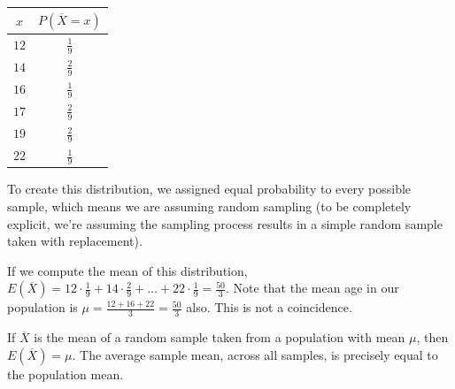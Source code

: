 \begin{example}
\vspace{-1em}
\begin{center}
    \begin{minipage}{.45\textwidth}
        \centering
      \renewcommand*{\arraystretch}{1.35}
\begin{tabular}{c|c}
$x$ & $P(\overline{X} = x)$ \\
\hline
$12$ & $\frac{1}{9}$ \\
$14$ & $\frac{2}{9}$ \\
$16$ & $\frac{1}{9}$ \\
$17$ & $\frac{2}{9}$ \\
$19$ & $\frac{2}{9}$ \\
$22$ & $\frac{1}{9}$
\end{tabular}
\renewcommand*{\arraystretch}{1}
\vspace{0.25em}
    \end{minipage}%
    \begin{minipage}{0.5\textwidth}
        \centering
{}
\end{minipage}
\end{center}
\begin{keypoint}
To create this distribution, we assigned equal probability to every possible sample, which means we are assuming random sampling (to be completely explicit, we're assuming the sampling process results in a simple random sample taken with replacement).
\end{keypoint}
If we compute the mean of this distribution, $E(\overline{X}) = 12 \cdot \frac{1}{9} + 14 \cdot \frac{2}{9} + \dots + 22 \cdot \frac{1}{9} = \frac{50}{3}$. Note that the mean age in our population is $\mu = \frac{12+16+22}{3} = \frac{50}{3}$ also. This is not a coincidence.
\end{example}

\begin{proposition}\label{MeanOfSampleMean}
If $\overline{X}$ is the mean of a random sample taken from a population with mean $\mu$, then $E(\overline{X}) = \mu$. The average sample mean, across all samples, is precisely equal to the population mean.
\end{proposition}

